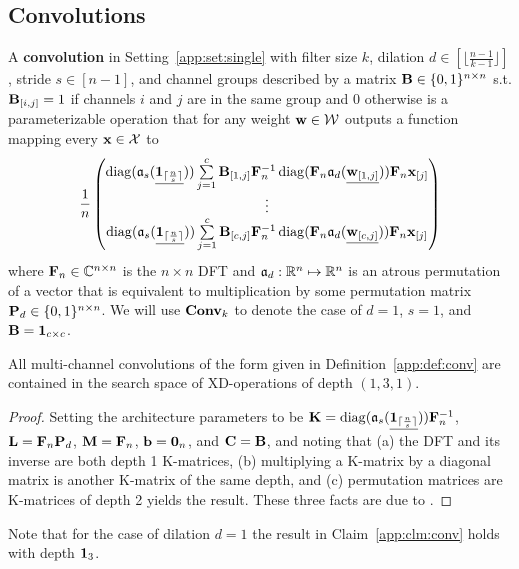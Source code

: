 \subsection{Convolutions}
\begin{Def}\label{app:def:conv}
	A {\bf convolution} in Setting~\ref{app:set:single} with filter size $k$, dilation $d\in[\lfloor\frac{n-1}{k-1}\rfloor]$, stride $s\in[n-1]$, and channel groups described by a matrix $\mathbf{B}\in\{0,1\}^{n\times n}$ s.t. $\mathbf{B}_{[i,j]}=1$ if channels $i$ and $j$ are in the same group and 0 otherwise is a parameterizable operation that for any weight $\mathbf{w}\in\mathcal W$ outputs a function mapping every $\mathbf{x}\in\mathcal X$ to
	\begin{equation}
	\frac1n
	\begin{pmatrix}
	\operatorname{\operatorname{diag}}(\mathfrak{a}_s(\underline{\mathbf 1_{\lceil\frac ns\rceil}}))\sum\limits_{j=1}^c\mathbf{B}_{[1,j]}\mathbf{F}_n^{-1}\operatorname{\operatorname{diag}}(\mathbf{F}_n\mathfrak{a}_d(\underline{\mathbf{w}_{[1,j]}}))\mathbf{F}_n\mathbf{x}_{[j]}\\
	\vdots\\
	\operatorname{\operatorname{diag}}(\mathfrak{a}_s(\underline{\mathbf 1_{\lceil\frac ns\rceil}}))\sum\limits_{j=1}^c\mathbf{B}_{[c,j]}\mathbf{F}_n^{-1}\operatorname{\operatorname{diag}}(\mathbf{F}_n\mathfrak{a}_d(\underline{\mathbf{w}_{[c,j]}}))\mathbf{F}_n\mathbf{x}_{[j]}
	\end{pmatrix}
	\end{equation}
	where $\mathbf{F}_n\in\mathbb C^{n\times n}$ is the $n\times n$ DFT and $\mathfrak{a}_d:\mathbb R^n\mapsto\mathbb R^n$ is an atrous permutation of a vector that is equivalent to multiplication by some permutation matrix $\mathbf{P}_d\in\{0,1\}^{n\times n}$.
	We will use $\operatorname{\operatorname{\bf Conv}}_k$ to denote the case of $d=1$, $s=1$, and $\mathbf{B}=\mathbf 1_{c\times c}$.
\end{Def}
\begin{Clm}\label{app:clm:conv}
	All multi-channel convolutions of the form given in Definition~\ref{app:def:conv} are contained in the search space of XD-operations of depth $(1,3,1)$.
\end{Clm}
\begin{proof}
	Setting the architecture parameters to be $\mathbf{K}=\operatorname{\operatorname{diag}}(\mathfrak{a}_s(\underline{\mathbf 1_{\lceil\frac ns\rceil}}))\mathbf{F}_n^{-1}$, $\mathbf{L}=\mathbf{F}_n\mathbf{P}_d$, $\mathbf{M}=\mathbf{F}_n$, $\mathbf{b}=\mathbf 0_n$, and $\mathbf{C}=\mathbf{B}$, and noting that (a) the DFT and its inverse are both depth 1 K-matrices, (b) multiplying a K-matrix by a diagonal matrix is another K-matrix of the same depth, and (c) permutation matrices are K-matrices of depth 2 yields the result.
	These three facts are due to \citet{dao2020kaleidoscope}.
\end{proof}
\begin{Rem}
	Note that for the case of dilation $d=1$ the result in Claim~\ref{app:clm:conv} holds with depth $\mathbf 1_3$.
\end{Rem}

